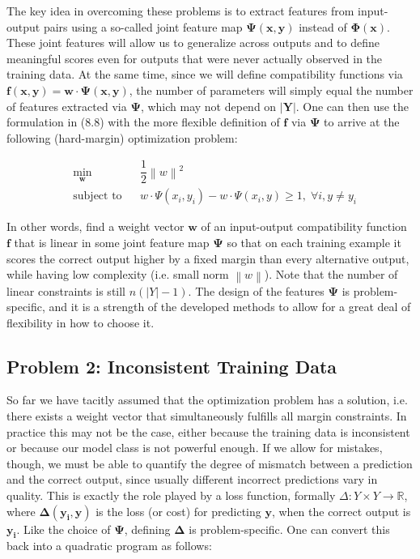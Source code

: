 \documentclass[twoside]{article}
\newcommand{\norm}[1]{\left\lVert #1 \right\rVert}
\begin{document}
The key idea in overcoming these problems is to extract
features from input-output pairs using a so-called joint feature map $\mathbf{\Psi(x, y)}$ instead of $\mathbf{\Phi(x)}$. These joint features will allow us to generalize across outputs and to define meaningful scores even
for outputs that were never actually observed in the training data. At the same time, since we will define compatibility
functions via $\mathbf{f(x, y) = w\cdot \Psi(x, y)}$, the number of parameters will simply equal the number of features extracted via
$\mathbf{\Psi}$, which may not depend on $\mathbf{|Y|}$. One can then use the formulation in (8.8) with the more flexible definition of $\mathbf{f}$ via $\mathbf{\Psi}$ to
arrive at the following (hard-margin) optimization problem:

\begin{equation*}
\begin{aligned}
& \underset{\textbf{w}}{\text{min}}
& & \dfrac{1}{2} \norm{w}^2  \\
& \text{subject to}
& & w \cdot \Psi(x_{i},y_{i}) - w \cdot \Psi(x_{i},y) \geq 1 , \;\forall i, y \not = y_{i}
\end{aligned}
\end{equation*}

In other words, find a weight vector $\mathbf{w}$ of an input-output compatibility function $\mathbf{f}$ that is linear in some joint feature map $\mathbf{\Psi}$
so that on each training example it scores the correct output
higher by a fixed margin than every alternative output, while
having low complexity (i.e. small norm $\norm{w}$). Note that the
number of linear constraints is still $n(|Y| -1)$. The design of the features $\mathbf{\Psi}$ is problem-specific, and it is a
strength of the developed methods to allow for a great deal of flexibility in how to choose it.

\subsection{Problem 2: Inconsistent Training Data}
So far we have tacitly assumed that the optimization problem has a solution, i.e. there exists a weight vector
that simultaneously fulfills all margin constraints. In practice this may not be the case, either because the training
data is inconsistent or because our model class is not powerful enough. If we allow for mistakes, though, we must
be able to quantify the degree of mismatch between a prediction and the correct output, since usually different incorrect predictions vary in quality. This is exactly the role
played by a loss function, formally $ \Delta : Y \times Y \rightarrow \mathbb{R}$, where
$\mathbf{\Delta(y_{i},y)}$ is the loss (or cost) for predicting $\mathbf{y}$, when the correct output is $\mathbf{y_{i}}$. Like the choice of $\mathbf{\Psi}$, defining $\mathbf{\Delta}$
is problem-specific. One can convert this back into a
quadratic program as follows:
\end{document}
